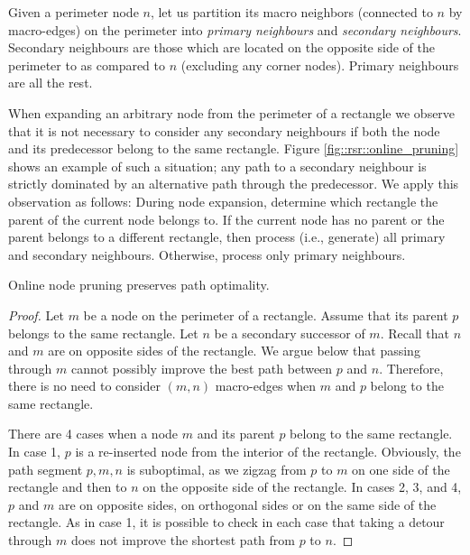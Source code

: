 Given a perimeter node $n$, let us partition its macro neighbors 
(connected to $n$ by macro-edges)
on the perimeter into 
\emph{primary neighbours} and \emph{secondary neighbours}.  Secondary neighbours are those
which are located on the opposite side of the perimeter to as compared to $n$
(excluding any corner nodes).  Primary neighbours are all the rest.

When expanding an arbitrary node from the perimeter of a rectangle we observe
that it is not necessary to consider any secondary neighbours if both the node
and its predecessor belong to the same rectangle. Figure \ref{fig::rsr::online_pruning}
shows an example of such a situation; any path to a secondary neighbour
is strictly dominated by an alternative path through the predecessor. 
We apply this observation as follows: {During
node expansion, determine which rectangle the parent of the current node belongs
to.} {If the current node has no parent or the parent belongs to a different
rectangle, then process (i.e., generate) all primary and secondary neighbours.
Otherwise, process only primary neighbours.}

\begin{lemma}
Online node pruning preserves path optimality.
\end{lemma}
\begin{proof}
Let $m$ be a node on the perimeter of a rectangle. Assume that its
parent $p$ belongs to the same rectangle.  Let $n$ be a secondary successor of
$m$.  Recall that $n$ and $m$ are on opposite sides of the rectangle.  We argue
below that passing through $m$ cannot possibly improve the best path between $p$
and $n$.  Therefore, there is no need to consider $(m,n)$ macro-edges when $m$
and $p$ belong to the same rectangle.

There are 4 cases when a node $m$ and its parent $p$ belong to the same
rectangle. In case 1, $p$ is a re-inserted node from the interior of the
rectangle.  Obviously, the path segment $p,m,n$ is suboptimal, as we zigzag from
$p$ to $m$ on one side of the rectangle and then to $n$ on the opposite side of
the rectangle.  In cases 2, 3, and 4, $p$ and $m$ are on opposite sides, on
orthogonal sides or on the same side of the rectangle. As in case 1, it is
possible to check in each case that taking a detour through $m$ does not improve
the shortest path from $p$ to $n$.
\end{proof}


